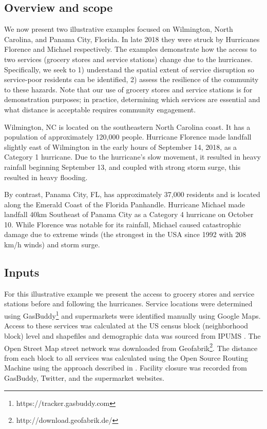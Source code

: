 \documentclass[onecolumn,doublespacing]{risa}
\let \citeA \textcite
\let \cite \parencite
\begin{document}
\subsection{Overview and scope}
We now present two illustrative examples focused on Wilmington, North Carolina, and Panama City, Florida.
In late 2018 they were struck by Hurricanes Florence and Michael respectively. 
The examples demonstrate how the access to two services (grocery stores and service stations) change due to the hurricanes. 
Specifically, we seek to 1) understand the spatial extent of service disruption so service-poor residents can be identified, 2) assess the resilience of the community to these hazards. 
Note that our use of grocery stores and service stations is for demonstration purposes; in practice, determining which services are essential and what distance is acceptable requires community engagement. 

Wilmington, NC is located on the southeastern North Carolina coast.
It has a population of approximately 120,000 people. 
Hurricane Florence made landfall slightly east of Wilmington in the early hours of September 14, 2018, as a Category 1 hurricane. 
Due to the hurricane’s slow movement, it resulted in heavy rainfall beginning September 13, and coupled with strong storm surge, this resulted in heavy flooding. 

By contrast, Panama City, FL, has approximately 37,000 residents and is located along the Emerald Coast of the Florida Panhandle. 
Hurricane Michael made landfall 40km Southeast of Panama City as a Category 4 hurricane on October 10. 
While Florence was notable for its rainfall, Michael caused catastrophic damage due to extreme winds (the strongest in the USA since 1992 with 208 km/h winds) and storm surge. 

\subsection{Inputs}
For this illustrative example we present the access to grocery stores and service stations before and following the hurricanes. 
Service locations were determined using GasBuddy\footnote{https://tracker.gasbuddy.com} and supermarkets were identified manually using Google Maps.
Access to these services was calculated at the US census block (neighborhood block) level and shapefiles and demographic data was sourced from IPUMS \cite{Manson2018-ug}. 
The Open Street Map street network was downloaded from Geofabrik\footnote{http://download.geofabrik.de/}. 
The distance from each block to all services was calculated using the Open Source Routing Machine using the approach described in \citeA{Logan2017-fr}. 
Facility closure was recorded from GasBuddy, Twitter, and the supermarket websites.
\end{document}
